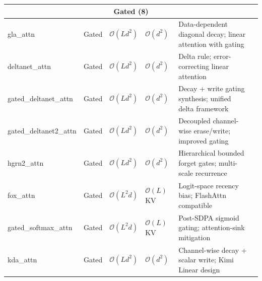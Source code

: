 \begin{longtable}{p{2.0cm}p{1.3cm}p{2.2cm}p{2.2cm}p{4.0cm}p{2.5cm}}
\multicolumn{6}{c}{\textbf{Gated (8)}} \\
\midrule
gla\_attn & Gated & $\mathcal{O}(L d^2)$ & $\mathcal{O}(d^2)$ & Data-dependent diagonal decay; linear attention with gating & \citep{yang_gla_2023} \\
deltanet\_attn & Gated & $\mathcal{O}(L d^2)$ & $\mathcal{O}(d^2)$ & Delta rule; error-correcting linear attention & \citep{yang_deltanet_2024} \\
gated\_deltanet\_attn & Gated & $\mathcal{O}(L d^2)$ & $\mathcal{O}(d^2)$ & Decay + write gating synthesis; unified delta framework & \citep{yang_gated_deltanet_2024} \\
gated\_deltanet2\_attn & Gated & $\mathcal{O}(L d^2)$ & $\mathcal{O}(d^2)$ & Decoupled channel-wise erase/write; improved gating & \citep{hatamizadeh_gated_deltanet2_2026} \\
hgrn2\_attn & Gated & $\mathcal{O}(L d^2)$ & $\mathcal{O}(d^2)$ & Hierarchical bounded forget gates; multi-scale recurrence & \citep{qin_hgrn2_2024} \\
fox\_attn & Gated & $\mathcal{O}(L^2 d)$ & $\mathcal{O}(L)$ KV & Logit-space recency bias; FlashAttn compatible & \citep{lin_forgetting_transformer_2025} \\
gated\_softmax\_attn & Gated & $\mathcal{O}(L^2 d)$ & $\mathcal{O}(L)$ KV & Post-SDPA sigmoid gating; attention-sink mitigation & \citep{qiu_gated_attention_2025} \\
kda\_attn & Gated & $\mathcal{O}(L d^2)$ & $\mathcal{O}(d^2)$ & Channel-wise decay + scalar write; Kimi Linear design & \citep{kimi_kda_2025} \\
\midrule


\end{longtable}
